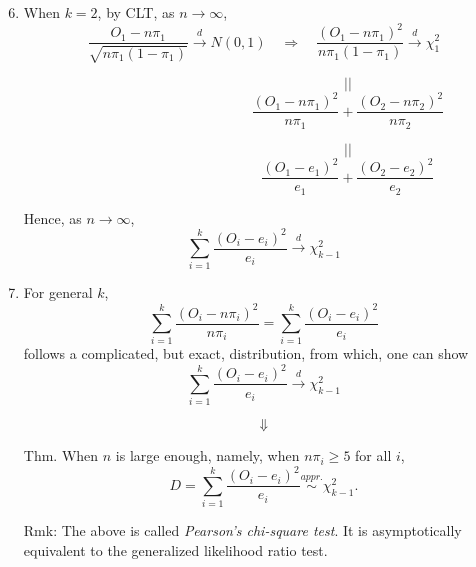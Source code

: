 \begin{frame}[fragile]

	\begin{enumerate}
		\setcounter{enumi}{5}
		\item When $k=2$, by CLT,  as $n\rightarrow \infty$,
			\[
				\frac{O_1-n\pi_1}{\sqrt{n\pi_1(1-\pi_1)}}\stackrel{d}{\rightarrow} N(0,1)\quad
				\Longrightarrow\quad
				\frac{(O_1-n\pi_1)^2}{n\pi_1(1-\pi_1)}\stackrel{d}{\rightarrow}\chi^2_1
			\]
		\item[]
				\[\hspace{12em}||\]
			\[
\hspace{12em}\frac{(O_1-n\pi_1)^2}{n\pi_1}
+\frac{(O_2-n\pi_2)^2}{n\pi_2}
			\]
		\item[]
			\[\hspace{12em}||\]
			\[
				\hspace{12em}\frac{(O_1-e_1)^2}{e_1}
				+\frac{(O_2-e_2)^2}{e_2}
			\]
			\vfill
		\item[] Hence, as $n\to\infty$,
			\[
				\sum_{i=1}^k
				\frac{(O_i-e_i)^2}{e_i}\stackrel{d}{\rightarrow}\chi^2_{k-1}
			\]
	\end{enumerate}
\end{frame}
\begin{frame}[fragile]

	\begin{enumerate}
		\setcounter{enumi}{6}
\item For general $k$,
			\[
\sum_{i=1}^k
\frac{(O_i-n\pi_i)^2}{n\pi_i} =
\sum_{i=1}^k
\frac{(O_i-e_i)^2}{e_i}
			\]
			follows a complicated, but exact, distribution, from which, one can show
			\[
	\sum_{i=1}^k
\frac{(O_i-e_i)^2}{e_i} \stackrel{d}{\rightarrow}\chi^2_{k-1}
			\]
			\vfill
		\item[]
			\[\Downarrow\]
			\vfill
		\item[Thm.] When $n$ is large enough, namely, when $n\pi_i\ge 5$ for all $i$,
			\[
				D=	\sum_{i=1}^k
				\frac{(O_i-e_i)^2}{e_i} \stackrel{appr.}{\sim}\chi^2_{k-1}.
			\]
			\vfill
		\item[Rmk:] The above is called {\em Pearson's chi-square test}. It is asymptotically equivalent to the generalized likelihood ratio test.
	\end{enumerate}
\end{frame}
